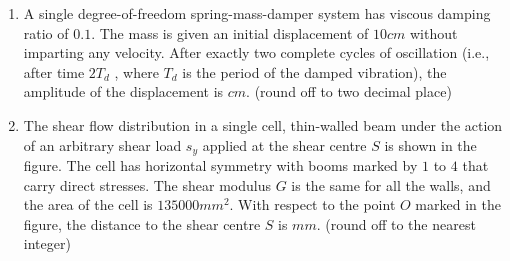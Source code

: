 \documentclass[journal,12pt,onecolumn]{IEEEtran}
\theoremstyle{remark}
\begin{document}
\begin{enumerate}[start=40]
	\item A single degree-of-freedom spring-mass-damper system has viscous damping ratio of $0.1$. The mass is given an initial displacement of $10 cm$ without imparting any velocity. After exactly two complete cycles of oscillation (i.e., after time $2T_d$ , where $T_d$ is the period of the damped vibration), the amplitude of the displacement is\underline{\hspace{2cm}} $cm$. (round off to two decimal place)
	
	\item The shear flow distribution in a single cell, thin-walled beam under the action of an arbitrary shear load $s_y$ applied at the shear centre $S$ is shown in the figure. The cell has horizontal symmetry with booms marked by $1$ to $4$ that carry direct stresses. The shear modulus $G$ is the same for all the walls, and the area of the cell is $135000 mm^2$. With respect to the point $O$ marked in the figure, the distance to the shear centre $S$ is \underline{\hspace{2cm}} $mm$. (round off to the nearest integer)\\
		\begin{center}
\end{center}


\end{enumerate}
\end{document}
